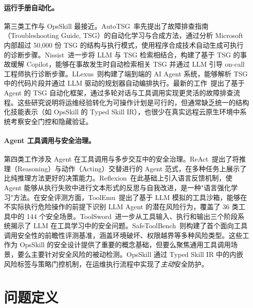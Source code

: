 \documentclass[11pt,a4paper]{ctexart}
\begin{document}
\paragraph{运行手册自动化。}
第三类工作与 OpsSkill 最接近。AutoTSG~\cite{shetty2022autotsg}率先提出了故障排查指南（Troubleshooting Guide, TSG）的自动化学习与合成方法，通过分析 Microsoft 内部超过 50,000 份 TSG 的结构与执行模式，使用程序合成技术自动生成可执行的诊断步骤。Nissist~\cite{an2024nissist}进一步将 LLM 与 TSG 检索相结合，构建了基于 TSG 的事故缓解 Copilot，能够在事故发生时自动检索相关 TSG 并通过 LLM 引导 on-call 工程师执行诊断步骤。LLexus~\cite{lascasas2024llexus}则构建了端到端的 AI Agent 系统，能够解析 TSG 中的代码片段并通过 LLM 驱动的规划器自动编排执行。最新的工作~\cite{mao2025agentic_tsg}提出了基于 Agent 的 TSG 自动化框架，通过多轮对话与工具调用实现更灵活的故障排查流程。这些研究说明将运维经验转化为可操作计划是可行的，但通常缺乏统一的结构化技能表示（如 OpsSkill 的 Typed Skill IR），也很少在真实远程云原生环境中系统考察安全门控和隐藏验证。

\paragraph{Agent 工具调用与安全治理。}
第四类工作涉及 Agent 在工具调用与多步交互中的安全治理。ReAct~\cite{yao2023react}提出了将推理（Reasoning）与动作（Acting）交替进行的 Agent 范式，在多种任务上展示了比纯推理方法更好的决策能力。Reflexion~\cite{shinn2023reflexion}在此基础上引入语言反馈机制，使 Agent 能够从执行失败中进行文本形式的反思与自我改进，是一种"语言强化学习"方法。在安全评测方面，ToolEmu~\cite{ruan2023toolemu}提出了基于 LLM 模拟的工具沙箱，能够在不实际执行危险操作的前提下识别 LLM Agent 的潜在风险行为，覆盖了 36 类工具中的 144 个安全场景。ToolSword~\cite{ye2024toolsword}进一步从工具输入、执行和输出三个阶段系统揭示了 LLM 在工具学习中的安全问题。SafeToolBench~\cite{xia2024safetoolbench}则构建了首个面向工具调用安全性的前瞻性评测基准，涵盖环境破坏、权限越界等多种风险类型。这些工作为 OpsSkill 的安全设计提供了重要的概念基础，但要么聚焦通用工具调用场景，要么主要针对安全风险的被动检测。OpsSkill 通过 Typed Skill IR 中的内嵌风险标签与策略门控机制，在运维执行流程中实现了\emph{主动}安全防护。


\section{问题定义}
\end{document}
